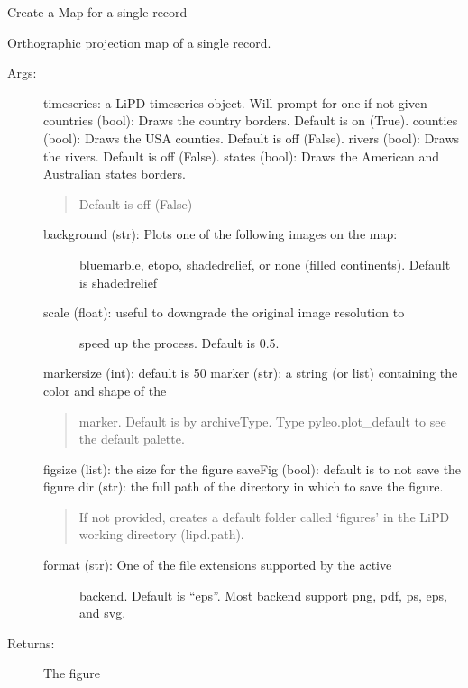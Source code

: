 \documentclass[letterpaper,10pt,english]{sphinxmanual}
\begin{document}

\begin{fulllineitems}
\label{\detokenize{Main:pyleoclim.mapLipd}}
Create a Map for a single record

Orthographic projection map of a single record.
\begin{description}
\item[{Args:}] \leavevmode
timeseries: a LiPD timeseries object. Will prompt for one if not given
countries (bool): Draws the country borders. Default is on (True).
counties (bool): Draws the USA counties. Default is off (False).
rivers (bool): Draws the rivers. Default is off (False).
states (bool): Draws the American and Australian states borders.
\begin{quote}

Default is off (False)
\end{quote}
\begin{description}
\item[{background (str): Plots one of the following images on the map:}] \leavevmode
bluemarble, etopo, shadedrelief, or none (filled continents).
Default is shadedrelief

\item[{scale (float): useful to downgrade the original image resolution to}] \leavevmode
speed up the process. Default is 0.5.

\end{description}

markersize (int): default is 50
marker (str): a string (or list) containing the color and shape of the
\begin{quote}

marker. Default is by archiveType. Type pyleo.plot\_default to see
the default palette.
\end{quote}

figsize (list): the size for the figure
saveFig (bool): default is to not save the figure
dir (str): the full path of the directory in which to save the figure.
\begin{quote}

If not provided, creates a default folder called ‘figures’ in the
LiPD working directory (lipd.path).
\end{quote}
\begin{description}
\item[{format (str): One of the file extensions supported by the active}] \leavevmode
backend. Default is “eps”. Most backend support png, pdf, ps, eps,
and svg.

\end{description}

\item[{Returns:}] \leavevmode
The figure

\end{description}

\end{fulllineitems}
\end{document}
